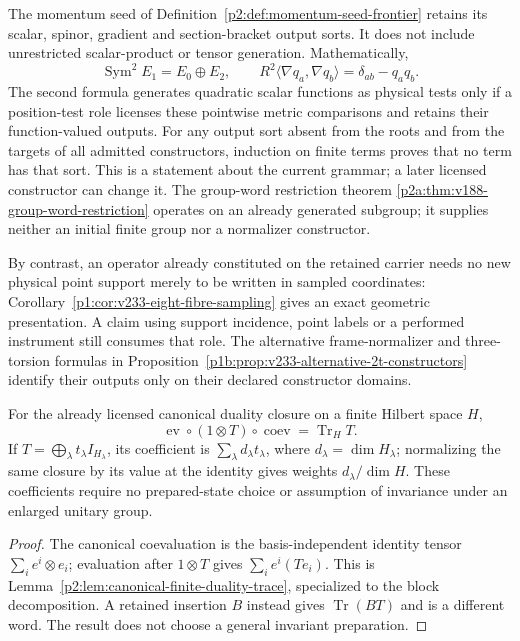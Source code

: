 \documentclass[12pt,a4paper]{article}
\begin{document}
\begin{remark}
\label{p2a:rem:v233-native-constructor-boundary}
The momentum seed of Definition~\ref{p2:def:momentum-seed-frontier}
retains its scalar, spinor, gradient and section-bracket output sorts.
It does not include unrestricted scalar-product or tensor generation.
Mathematically,
\[
 \operatorname{Sym}^2 E_1=E_0\oplus E_2,\qquad
 R^2\langle\nabla q_a,\nabla q_b\rangle=\delta_{ab}-q_aq_b .
\]
The second formula generates quadratic scalar functions as physical
tests only if a position-test role licenses these pointwise metric
comparisons and retains their function-valued outputs.
For any output sort absent from the roots and from the targets of
all admitted constructors, induction on finite terms proves that no
term has that sort. This is a statement about the current grammar;
a later licensed constructor can change it.
The group-word restriction theorem
\ref{p2a:thm:v188-group-word-restriction} operates on an already
generated subgroup; it supplies neither an initial finite group nor
a normalizer constructor.

By contrast, an operator already constituted on the retained carrier
needs no new physical point support merely to be written in sampled
coordinates: Corollary~\ref{p1:cor:v233-eight-fibre-sampling} gives
an exact geometric presentation. A claim using support incidence,
point labels or a performed instrument still consumes that role.
The alternative frame-normalizer and three-torsion formulas in
Proposition~\ref{p1b:prop:v233-alternative-2t-constructors} identify
their outputs only on their declared constructor domains.
\end{remark}

\begin{corollary}
\label{p2a:cor:v233-loop-coefficients}
For the already licensed canonical duality closure on a finite Hilbert
space \(H\),
\[
 \operatorname{ev}\circ(1\otimes T)\circ\operatorname{coev}
       =\operatorname{Tr}_H T .
\]
If \(T=\bigoplus_\lambda t_\lambda I_{H_\lambda}\), its coefficient
is \(\sum_\lambda d_\lambda t_\lambda\), where
\(d_\lambda=\dim H_\lambda\); normalizing the same closure by its
value at the identity gives weights \(d_\lambda/\dim H\).
These coefficients require no prepared-state choice or assumption
of invariance under an enlarged unitary group.
\end{corollary}
\begin{proof}
The canonical coevaluation is the basis-independent identity tensor
\(\sum_i e^i\otimes e_i\); evaluation after \(1\otimes T\)
gives \(\sum_i e^i(Te_i)\). This is
Lemma~\ref{p2:lem:canonical-finite-duality-trace}, specialized to
the block decomposition. A retained insertion \(B\) instead gives
\(\operatorname{Tr}(BT)\) and is a different word.
The result does not choose a general invariant preparation.
\end{proof}
\end{document}
